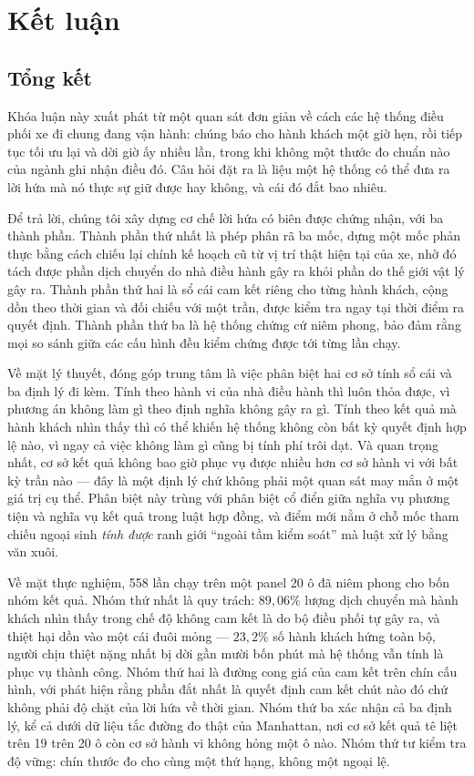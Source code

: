 \chapter{Kết luận}

\section{Tổng kết}

Khóa luận này xuất phát từ một quan sát đơn giản về cách các hệ thống điều phối xe đi chung
đang vận hành: chúng báo cho hành khách một giờ hẹn, rồi tiếp tục tối ưu lại và dời giờ ấy nhiều
lần, trong khi không một thước đo chuẩn nào của ngành ghi nhận điều đó. Câu hỏi đặt ra là liệu
một hệ thống có thể đưa ra lời hứa mà nó thực sự giữ được hay không, và cái đó đắt bao nhiêu.

Để trả lời, chúng tôi xây dựng cơ chế lời hứa có biên được chứng nhận, với ba thành phần. Thành
phần thứ nhất là phép phân rã ba mốc, dựng một mốc phản thực bằng cách chiếu lại chính kế hoạch
cũ từ vị trí thật hiện tại của xe, nhờ đó tách được phần dịch chuyển do nhà điều hành gây ra
khỏi phần do thế giới vật lý gây ra. Thành phần thứ hai là sổ cái cam kết riêng cho từng hành
khách, cộng dồn theo thời gian và đối chiếu với một trần, được kiểm tra ngay tại thời điểm ra
quyết định. Thành phần thứ ba là hệ thống chứng cứ niêm phong, bảo đảm rằng mọi so sánh giữa
các cấu hình đều kiểm chứng được tới từng lần chạy.

Về mặt lý thuyết, đóng góp trung tâm là việc phân biệt hai cơ sở tính sổ cái và ba định lý đi
kèm. Tính theo hành vi của nhà điều hành thì luôn thỏa được, vì phương án không làm gì theo định
nghĩa không gây ra gì. Tính theo kết quả mà hành khách nhìn thấy thì có thể khiến hệ thống không
còn bất kỳ quyết định hợp lệ nào, vì ngay cả việc không làm gì cũng bị tính phí trôi dạt. Và
quan trọng nhất, cơ sở kết quả không bao giờ phục vụ được nhiều hơn cơ sở hành vi với bất kỳ
trần nào --- đây là một định lý chứ không phải một quan sát may mắn ở một giá trị cụ thể. Phân
biệt này trùng với phân biệt cổ điển giữa nghĩa vụ phương tiện và nghĩa vụ kết quả trong luật
hợp đồng, và điểm mới nằm ở chỗ mốc tham chiếu ngoại sinh \emph{tính được} ranh giới ``ngoài
tầm kiểm soát'' mà luật xử lý bằng văn xuôi.

Về mặt thực nghiệm, 558 lần chạy trên một panel 20 ô đã niêm phong cho bốn nhóm kết quả. Nhóm
thứ nhất là quy trách: $89{,}06\%$ lượng dịch chuyển mà hành khách nhìn thấy trong chế độ không
cam kết là do bộ điều phối tự gây ra, và thiệt hại dồn vào một cái đuôi mỏng --- $23{,}2\%$ số
hành khách hứng toàn bộ, người chịu thiệt nặng nhất bị dời gần mười bốn phút mà hệ thống vẫn
tính là phục vụ thành công. Nhóm thứ hai là đường cong giá của cam kết trên chín cấu hình, với
phát hiện rằng phần đắt nhất là quyết định cam kết chút nào đó chứ không phải độ chặt của lời
hứa về thời gian. Nhóm thứ ba xác nhận cả ba định lý, kể cả dưới dữ liệu tắc đường đo thật của
Manhattan, nơi cơ sở kết quả tê liệt trên 19 trên 20 ô còn cơ sở hành vi không hỏng một ô nào.
Nhóm thứ tư kiểm tra độ vững: chín thước đo cho cùng một thứ hạng, không một ngoại lệ.


